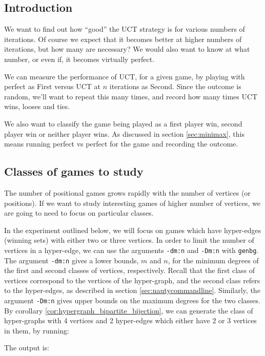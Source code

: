 \subsection{Introduction}


We want to find out how ``good'' the UCT strategy is for various numbers of iterations.
Of course we expect that it becomes better at higher numbers of iterations, but how many are necessary?
We would also want to know at what number, or even if, it becomes virtually perfect.

We can measure the performance of UCT, for a given game, by playing with perfect as First versus UCT at $n$ iterations as Second.
Since the outcome is random, we'll want to repeat this many times, and record how many times UCT wins, looses and ties.

We also want to classify the game being played as a first player win, second player win or neither player wins.
As discussed in section \ref{sec:minimax}, this means running perfect vs perfect for the game and recording the outcome.


\subsection{Classes of games to study}

The number of positional games grows rapidly with the number of vertices (or positions).
If we want to study interesting games of higher number of vertices, we are going to need to focus on particular classes.

In the experiment outlined below, we will focus on games which have hyper-edges (winning sets) with either two or three vertices.
In order to limit the number of vertices in a hyper-edge, we can use the arguments \texttt{-dm:n} and \texttt{-Dm:n} with \texttt{genbg}.
The argument \texttt{-dm:n} gives a lower bounds, $m$ and $n$, for the minimum degrees of the first and second classes of vertices, respectively.
Recall that the first class of vertices correspond to the vertices of the hyper-graph, and the second class refers to the hyper-edges, as described in section \ref{sec:nautycommandline}.
Similarly, the argument \texttt{-Dm:n} gives upper bounds on the maximum degrees for the two classes.
By corollary \ref{cor:hypergraph_bipartite_bijection}, we can generate the class of hyper-graphs with 4 vertices and 2 hyper-edges which either have 2 or 3 vertices in them, by running:


The output is:

